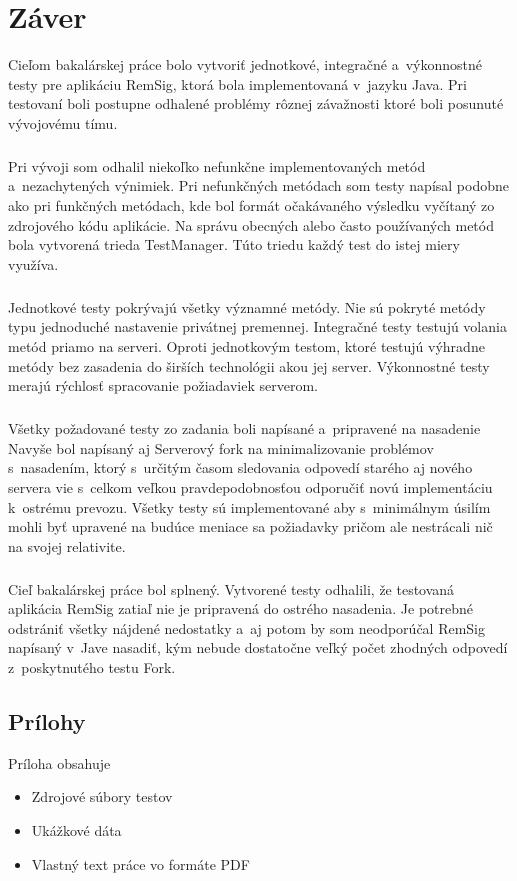 \documentclass[
  digital, %
  table,   %
oneside,
  nolof,     %
  nolot,     %
]{fithesis3}
\begin{document}
\chapter{Záver}
Cieľom bakalárskej práce bolo vytvoriť jednotkové, integračné a~výkonnostné testy pre aplikáciu RemSig, ktorá bola implementovaná v~jazyku Java. Pri testovaní boli postupne odhalené problémy rôznej závažnosti ktoré boli posunuté vývojovému tímu. \paragraph{}
Pri vývoji som odhalil niekoľko nefunkčne implementovaných metód a~nezachytených výnimiek. Pri nefunkčných metódach som testy napísal podobne ako pri funkčných metódach, kde bol formát očakávaného výsledku vyčítaný zo zdrojového kódu aplikácie. Na správu obecných alebo často používaných metód bola vytvorená trieda TestManager. Túto triedu každý test do istej miery využíva. \paragraph{}
Jednotkové testy pokrývajú všetky významné metódy. Nie sú pokryté metódy typu jednoduché nastavenie privátnej premennej. Integračné testy testujú volania metód priamo na serveri. Oproti jednotkovým testom, ktoré testujú výhradne metódy bez zasadenia do širších technológii akou jej server. Výkonnostné testy merajú rýchlosť spracovanie požiadaviek serverom.\paragraph{}
Všetky požadované testy zo zadania boli napísané a~pripravené na nasadenie Navyše bol napísaný aj Serverový fork na minimalizovanie problémov s~nasadením, ktorý s~určitým časom sledovania odpovedí starého aj nového servera vie s~celkom veľkou pravdepodobnosťou odporučiť novú implementáciu k~ostrému prevozu. Všetky testy sú  implementované aby s~minimálnym úsilím mohli byť upravené na budúce meniace sa požiadavky pričom ale nestrácali nič na svojej relativite.\paragraph{}
Cieľ bakalárskej práce bol splnený. Vytvorené testy odhalili, že testovaná aplikácia RemSig zatiaľ nie je pripravená do ostrého nasadenia. Je potrebné odstrániť všetky nájdené nedostatky a~aj potom by som neodporúčal RemSig napísaný v~Jave nasadiť, kým nebude dostatočne veľký počet zhodných odpovedí z~poskytnutého testu Fork.  

\printbibliography

  

\begin{appendix}


\chapter{Prílohy}
Príloha obsahuje
\begin{itemize}
	\item Zdrojové súbory testov
	\item Ukážkové dáta 
	\item Vlastný text práce vo formáte PDF
\end{itemize}



\end{appendix}
\end{document}
